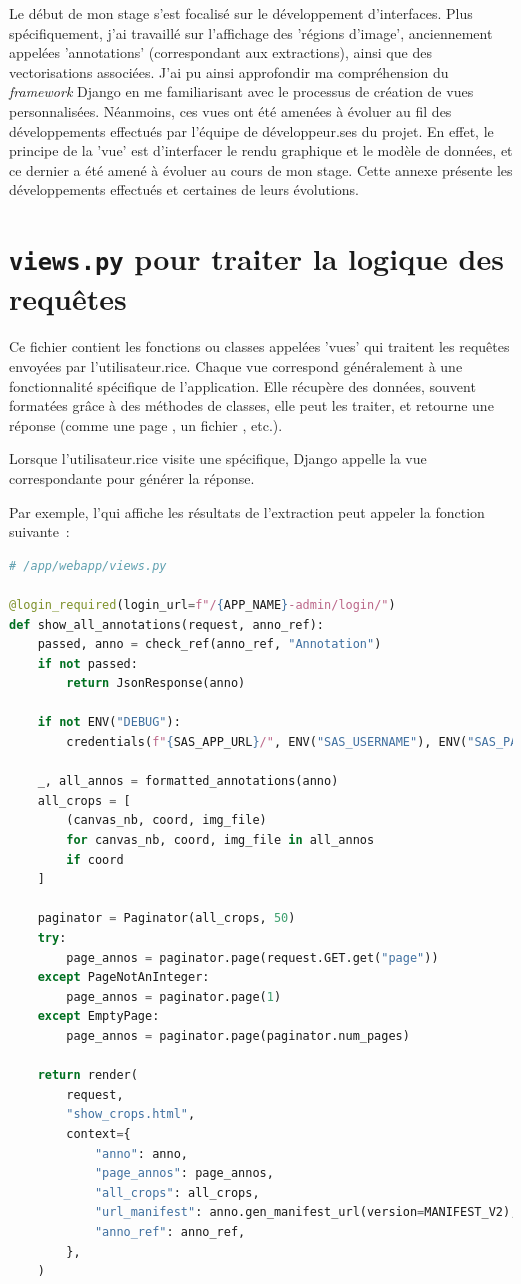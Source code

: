Le début de mon stage s'est focalisé sur le développement d'interfaces. Plus spécifiquement, j'ai travaillé sur l'affichage des 'régions d'image', anciennement appelées 'annotations' (correspondant aux extractions), ainsi que des vectorisations associées. J'ai pu ainsi approfondir ma compréhension du \textit{framework} Django en me familiarisant avec le processus de création de vues personnalisées. Néanmoins, ces vues ont été amenées à évoluer au fil des développements effectués par l'équipe de développeur.ses du projet. En effet, le principe de la 'vue' est d'interfacer le rendu graphique et le modèle de données, et ce dernier a été amené à évoluer au cours de mon stage. Cette annexe présente les développements effectués et certaines de leurs évolutions. 

\section{\texttt{views.py} pour traiter la logique des requêtes}

Ce fichier contient les fonctions ou classes appelées 'vues' qui traitent les requêtes \http envoyées par l'utilisateur.rice. Chaque vue correspond généralement à une fonctionnalité spécifique de l'application. Elle récupère des données, souvent formatées grâce à des méthodes de classes, elle peut les traiter, et retourne une réponse \http (comme une page \html, un fichier \json, etc.).

Lorsque l'utilisateur.rice visite une \URL spécifique, Django appelle la vue correspondante pour générer la réponse.

Par exemple, l'\URL qui affiche les résultats de l'extraction peut appeler la fonction suivante~:

\begin{lstlisting}[language=python, frame=single, breaklines=true, caption={Vue pour l'affichage des extraction en \enquote{dump}.}]
# /app/webapp/views.py

@login_required(login_url=f"/{APP_NAME}-admin/login/")
def show_all_annotations(request, anno_ref):
    passed, anno = check_ref(anno_ref, "Annotation")
    if not passed:
        return JsonResponse(anno)

    if not ENV("DEBUG"):
        credentials(f"{SAS_APP_URL}/", ENV("SAS_USERNAME"), ENV("SAS_PASSWORD"))

    _, all_annos = formatted_annotations(anno)
    all_crops = [
        (canvas_nb, coord, img_file)
        for canvas_nb, coord, img_file in all_annos
        if coord
    ]

    paginator = Paginator(all_crops, 50)
    try:
        page_annos = paginator.page(request.GET.get("page"))
    except PageNotAnInteger:
        page_annos = paginator.page(1)
    except EmptyPage:
        page_annos = paginator.page(paginator.num_pages)

    return render(
        request,
        "show_crops.html",
        context={
            "anno": anno,
            "page_annos": page_annos,
            "all_crops": all_crops,
            "url_manifest": anno.gen_manifest_url(version=MANIFEST_V2),
            "anno_ref": anno_ref,
        },
    )
\end{lstlisting}

